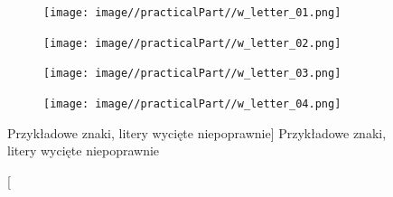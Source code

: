 \documentclass[a4paper,12pt]{article}
\begin{document}
            \begin{figure}[h!]
                \centering
                \begin{subfigure}[b]{2cm}
                    \texttt{[image: image//practicalPart//w\_letter\_01.png]}
                \caption{}
                \end{subfigure}
                \begin{subfigure}[b]{2cm}
                    \texttt{[image: image//practicalPart//w\_letter\_02.png]}
                \caption{}
                \end{subfigure}
              \newline
                \begin{subfigure}[b]{2cm}
                    \texttt{[image: image//practicalPart//w\_letter\_03.png]}
                \caption{}
                \end{subfigure}
                \begin{subfigure}[b]{2cm}
                    \texttt{[image: image//practicalPart//w\_letter\_04.png]}
                    \caption{}
                \end{subfigure}
                \caption
                    [Przykładowe znaki, litery wycięte niepoprawnie]
                    {Przykładowe znaki, litery wycięte niepoprawnie}
            \end{figure}
\end{document}
